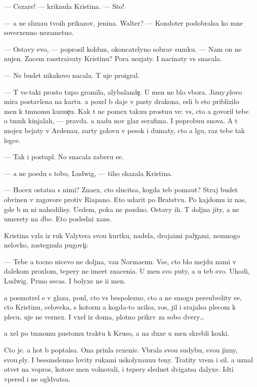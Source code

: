 \documentclass[10pt]{book}
\begin{document}
— Cezare! — kriknula Kristina. — Sto{\y}!

— {\Y}a ne sluxa{\y}u tvo{\y}ih prikazov, jen{\x}ina. Walter? — Kondot{\y}er podobralsa ko mne soverxenno nezametno.

— Ostavy {\y}evo, — poprosil koldun, okoncatelyno sobrav sumku. — Nam on ne nujen. Zacem rasstra{\y}ivaty Kristinu? Pora u{\y}ezjaty. I nacinaty vs{\e} snacala.

— Ne budet nikakovo nacala. T{\yi} uje proigral.

— T{\yi} vs{\e}-taki prosto tupo{\y} gromila, alybalande{\c}. U men{\ia} ne b{\yi}lo v{\yi}bora. Jizny {\c}elovo mira postavlena na kartu. {\Y}a poxel b{\yi} daje v pasty drakona, {\y}esli b{\yi} eto priblizilo men{\ia} k t{\e}mnomu kuzne{\c}u. Kak t{\yi} ne po{\y}mex taku{\y}u prostu{\y}u ve{\x}: vs{\e}, cto {\y}a govoril tebe o t{\e}mn{\yi}h kinjalah, — pravda. {\Y}a na{\y}du nov{\yi}{\y} glaz serafima. I poprobu{\y}u snova. A t{\yi} mojex bejaty v Ardenau, zar{\yi}ty golovu v pesok i dumaty, cto {\y}a lgu, raz tebe tak legce.

— Tak i postupl{\iu}. No snacala zaberu {\y}e{\y}e.

— {\Y}a ne po{\y}edu s tobo{\y}, Ludwig, — tiho skazala Kristina.

— Hocex ostatsa s nimi? Zna{\y}ex, cto slucitsa, kogda teb{\ia} po{\y}ma{\y}ut? Straj budet obvinen v zagovore protiv Riapano. Eto udarit po Bratstvu. Po kajdomu iz nas, gde b{\yi} m{\yi} ni nahodilisy. U{\y}edem, poka ne pozdno. Ostavy ih. T{\yi} doljna jity, a ne umerety na d{\yi}be. Eto posledni{\y} xans.

Kristina vz{\ia}la iz ruk Valytera svo{\y}u kurtku, nadela, droja{\x}imi paly{\c}ami, nemnogo nelovko, zastegnula pugovi{\c}i:

— Tebe {\y}a tocno nicevo ne doljna, van Normaenn. Vse, cto b{\yi}lo mejdu nami v dalekom proxlom, tepery ne ime{\y}et znaceni{\y}a. U men{\ia} svo{\y} puty, a u teb{\ia} svo{\y}. Uhodi, Ludwig. Pr{\ia}mo se{\y}cas. I bolyxe ne i{\x}i men{\ia}.

{\Y}a posmotrel {\y}e{\y} v glaza, pon{\ia}l, cto vs{\e} bespolezno, cto {\y}a ne smogu pereubedity {\y}e{\y}e, cto Kristinu, celoveka, s kotor{\yi}m {\y}a kogda-to ucilsa, ros, jil i srajalsa plecom k plecu, uje ne vernex. I v{\yi}xel iz doma, plotno prikr{\yi}v za sobo{\y} dvery…

{\Y}a xel po t{\e}mnomu pustomu traktu k Kruso, a na duxe u men{\ia} skrebli koxki.

Cto je. {\Y}a hot{\ia} b{\yi} pop{\yi}talsa. Ona prin{\ia}la rexeni{\y}e. V{\yi}brala svo{\y}u sudybu, svo{\y}u jizny, svo{\y}u {\c}ely. I bessm{\yi}slenno lovity rukami uskolyza{\y}u{\x}u{\y}u teny. Tratity vrem{\ia} i sil{\yi}. {\Y}a uznal otvet{\yi} na vopros{\yi}, kotor{\yi}{\y}e men{\ia} volnovali, i tepery sledu{\y}et dvigatsa dalyxe. Idti vpered i ne ogl{\ia}d{\yi}vatsa.
\end{document}
